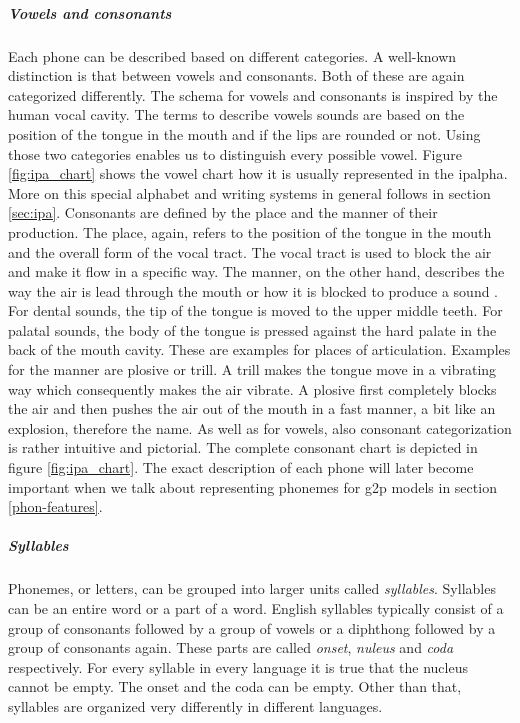 \subparagraph{Vowels and consonants} Each phone can be described based on different categories. A well-known distinction is that between vowels and consonants. Both of these are again categorized differently. The schema for vowels and consonants is inspired by the human vocal cavity. The terms to describe vowels sounds are based on the position of the tongue in the mouth and if the lips are rounded or not. Using those two categories enables us to distinguish every possible vowel. Figure \ref{fig:ipa_chart} shows the vowel chart how it is usually represented in the \ac{ipalpha}. More on this special alphabet and writing systems in general follows in section \ref{sec:ipa}. Consonants are defined by the place and the manner of their production. The place, again, refers to the position of the tongue in the mouth and the overall form of the vocal tract. The vocal tract is used to block the air and make it flow in a specific way. The manner, on the other hand, describes the way the air is lead through the mouth or how it is blocked to produce a sound \citep{phonetics-video}. For dental sounds, the tip of the tongue is moved to the upper middle teeth. For palatal sounds, the body of the tongue is pressed against the hard palate in the back of the mouth cavity. These are examples for places of articulation. Examples for the manner are plosive or trill. A trill makes the tongue move in a vibrating way which consequently makes the air vibrate. A plosive first completely blocks the air and then pushes the air out of the mouth in a fast manner, a bit like an explosion, therefore the name. As well as for vowels, also consonant categorization is rather intuitive and pictorial. The complete consonant chart is depicted in figure \ref{fig:ipa_chart}. The exact description of each phone will later become important when we talk about representing phonemes for \ac{g2p} models in section \ref{phon-features}. 

\subparagraph{Syllables} Phonemes, or letters, can be grouped into larger units called \textit{syllables}. Syllables can be an entire word or a part of a word. English syllables typically consist of a group of consonants followed by a group of vowels or a diphthong followed by a group of consonants again. These parts are called \textit{onset}, \textit{nuleus} and \textit{coda} respectively.  For every syllable in every language it is true that the nucleus cannot be empty. The onset and the coda can be empty. Other than that, syllables are organized very differently in different languages. \citep{Intro.2007}

